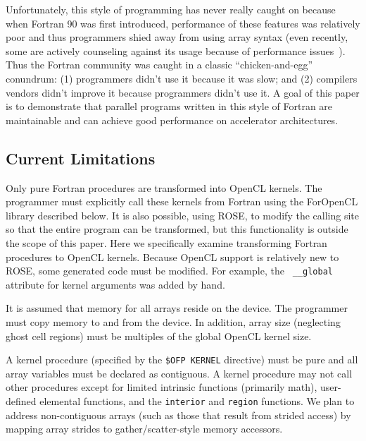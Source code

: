 
Unfortunately, this style of programming has never really caught on
because when Fortran 90 was first introduced, performance of these
features was relatively poor and thus programmers shied away from
using array syntax (even recently, some are actively counseling against its
usage because of performance issues~\cite{Levesque:SC08}).  Thus the
Fortran community was caught in a classic ``chicken-and-egg''
conundrum: (1) programmers didn't use it because it was slow; and (2)
compilers vendors didn't improve it because programmers didn't use it.
A goal of this paper is to demonstrate that parallel programs written
in this style of Fortran are maintainable and can achieve good
performance on accelerator architectures.

\subsection{Current Limitations}

Only pure Fortran procedures are transformed into OpenCL kernels.  The
programmer must explicitly call these kernels from Fortran using the
ForOpenCL library described below.  It is also possible, using ROSE,
to modify the calling site so that the entire program can be
transformed, but this functionality is outside the scope of this
paper.  Here we specifically examine transforming Fortran procedures
to OpenCL kernels.  Because OpenCL support is relatively new to ROSE,
some generated code must be modified.  For example, the {\tt
  \_\_global} attribute for kernel arguments was added by hand.

It is assumed that memory for all arrays reside on the device.  The
programmer must copy memory to and from the device.  In addition,
array size (neglecting ghost cell regions) must be multiples of the
global OpenCL kernel size.


A kernel procedure (specified by the {\tt \!\$OFP KERNEL} directive) must be
pure and all array variables must be declared as contiguous.  A kernel
procedure may not call other procedures except for limited intrinsic
functions (primarily math), user-defined elemental functions, and the
{\tt interior} and {\tt region} functions.  We plan to address
non-contiguous arrays (such as those that result from strided access)
by mapping array strides to gather/scatter-style memory accessors.
